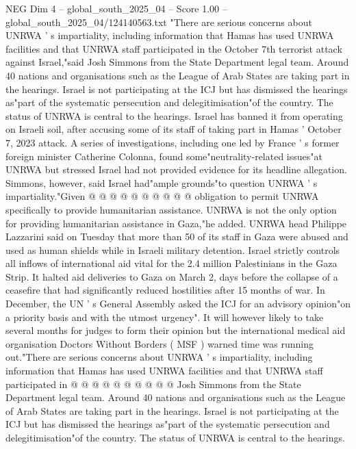 \begin{textsample}{NEG Dim 4 – global\_south\_2025\_04 – Score 1.00 – global\_south\_2025\_04/124140563.txt}  \label{ex:f4_neg_233}
"There are serious concerns about UNRWA ' s impartiality, including information that Hamas has used UNRWA facilities and that UNRWA staff participated in the October 7th terrorist attack against Israel,"said Josh Simmons from the State Department legal team.
Around 40 nations and organisations such as the League of Arab States are taking part in the hearings.
Israel is not participating at the ICJ but has dismissed the hearings as"part of the systematic persecution and delegitimisation"of the country.
The status of UNRWA is central to the hearings.
Israel has banned it from operating on Israeli soil, after accusing some of its staff of taking part in Hamas ' October 7, 2023 attack.
A series of investigations, including one led by France ' s former foreign minister Catherine Colonna, found some"neutrality-related issues"at UNRWA but stressed Israel had not provided evidence for its headline allegation.
Simmons, however, said Israel had"ample grounds"to question UNRWA ' s impartiality."Given @ @ @ @ @ @ @ @ @ @ obligation to permit UNRWA specifically to provide humanitarian assistance.
UNRWA is not the only option for providing humanitarian assistance in Gaza,"he added.
UNRWA head Philippe Lazzarini said on Tuesday that more than 50 of its staff in Gaza were abused and used as human shields while in Israeli military detention.
Israel strictly controls all inflows of international aid vital for the 2.4 million Palestinians in the Gaza Strip.
It halted aid deliveries to Gaza on March 2, days before the collapse of a ceasefire that had significantly reduced hostilities after 15 months of war.
In December, the UN ' s General Assembly asked the ICJ for an advisory opinion"on a priority basis and with the utmost urgency".
It will however likely to take several months for judges to form their opinion but the international medical aid organisation Doctors Without Borders ( MSF ) warned time was running out."There are serious concerns about UNRWA ' s impartiality, including information that Hamas has used UNRWA facilities and that UNRWA staff participated in @ @ @ @ @ @ @ @ @ @ Josh Simmons from the State Department legal team.
Around 40 nations and organisations such as the League of Arab States are taking part in the hearings.
Israel is not participating at the ICJ but has dismissed the hearings as"part of the systematic persecution and delegitimisation"of the country.
The status of UNRWA is central to the hearings.

\end{textsample}
